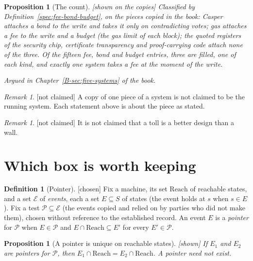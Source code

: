 \documentclass[11pt, a4paper]{article}
\theoremstyle{plain}
\newtheorem{proposition}[theorem]{Proposition}
\theoremstyle{definition}
\newtheorem{definition}[theorem]{Definition}
\theoremstyle{remark}
\newtheorem{remark}[theorem]{Remark}
\newcommand{\argued}[1]{\par\noindent\textit{Argued in Chapter~\ref{B-#1} of the book.}\par}
\newcommand{\kind}[1]{\textup{[#1]}}
\begin{document}
\begin{proposition}[The count]\label{spec:five-count} \kind{shown on the copies}
Classified by Definition~\ref{spec:fee-bond-budget}, on the pieces copied in the book: Casper attaches a
bond to the write and takes it only on contradicting votes; gas attaches a fee to the write and a budget
(the gas limit of each block); the quoted registers of the security chip, certificate transparency and
proof-carrying code attach none of the three. Of the fifteen fee, bond and budget entries, three are
filled, one of each kind, and exactly one system takes a fee at the moment of the write.
\end{proposition}

\argued{sec:five-systems}

\begin{remark}\label{spec:copy-not-system} \kind{not claimed}
A copy of one piece of a system is not claimed to be the running system. Each statement above is about the
piece as stated.
\end{remark}

\begin{remark}\label{spec:toll-vs-wall} \kind{not claimed}
It is not claimed that a toll is a better design than a wall.
\end{remark}

\section{Which box is worth keeping}\label{spec:ch19}

\begin{definition}[Pointer]\label{spec:pointer-def} \kind{chosen}
Fix a machine, its set $\mathrm{Reach}$ of reachable states, and a set $\mathcal E$ of \emph{events}, each
a set $E\subseteq S$ of states (the event holds at $s$ when $s\in E$). Fix a test
$\mathcal P\subseteq\mathcal E$ (the events copied and relied on by parties who did not make them), chosen
without reference to the established record. An event $E$ is a \emph{pointer} for $\mathcal P$ when
$E\in\mathcal P$ and $E\cap\mathrm{Reach}\subseteq E'$ for every $E'\in\mathcal P$.
\end{definition}

\begin{proposition}[A pointer is unique on reachable states]\label{spec:pointer-unique} \kind{shown}
If $E_1$ and $E_2$ are pointers for $\mathcal P$, then $E_1\cap\mathrm{Reach}=E_2\cap\mathrm{Reach}$.
A pointer need not exist.
\end{proposition}
\end{document}
